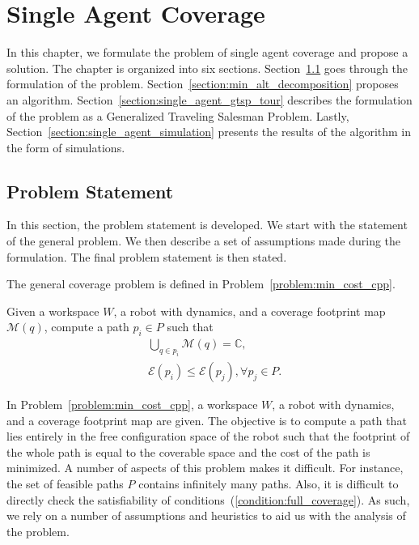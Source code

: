 \documentclass[../main.tex]{subfiles}
\begin{document}
\chapter{Single Agent Coverage}
\label{chapter:single_agent_coverage}

In this chapter, we formulate the problem of single agent coverage and propose a solution. The chapter is organized into six sections. Section~\ref{section:single_problem_statement} goes through the formulation of the problem. Section~\ref{section:min_alt_decomposition} proposes an algorithm. %
Section~\ref{section:single_agent_gtsp_tour} describes the formulation of the problem as a Generalized Traveling Salesman Problem. Lastly, Section~\ref{section:single_agent_simulation} presents the results of the algorithm in the form of simulations.

\section{Problem Statement}
\label{section:single_problem_statement}

In this section, the problem statement is developed. We start with the statement of the general problem. We then describe a set of assumptions made during the formulation. The final problem statement is then stated.

The general coverage problem is defined in Problem~\ref{problem:min_cost_cpp}.
\begin{problem}
\label{problem:min_cost_cpp}
	Given a workspace $W$, a robot with dynamics, and a coverage footprint map $\mathcal{M}(q)$, compute a path $p_i\in P$ such that
	\begin{equation}
	\label{condition:full_coverage}
	\begin{aligned}
		& \bigcup_{q\in p_i}\mathcal{M}(q)=\mathbb{C},\\
		& \mathcal{E}(p_i)\leq\mathcal{E}(p_j), \forall p_j\in P.
	\end{aligned}
	\end{equation}
\end{problem}

In Problem~\ref{problem:min_cost_cpp}, a workspace $W$, a robot with dynamics, and a coverage footprint map are given. The objective is to compute a path that lies entirely in the free configuration space of the robot such that the footprint of the whole path is equal to the coverable space and the cost of the path is minimized. A number of aspects of this problem makes it difficult. For instance, the set of feasible paths $P$ contains infinitely many paths. Also, it is difficult to directly check the satisfiability of conditions~(\ref{condition:full_coverage}). As such, we rely on a number of assumptions and heuristics to aid us with the analysis of the problem.
\end{document}
